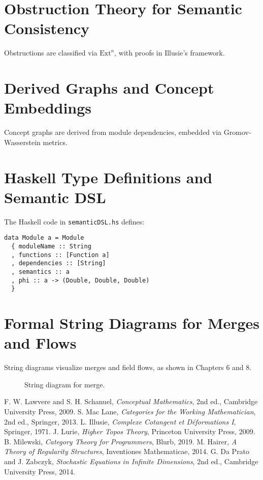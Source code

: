 \documentclass[12pt]{article}
\begin{document}
\section{Obstruction Theory for Semantic Consistency}
Obstructions are classified via $\text{Ext}^n$, with proofs in Illusie’s framework.

\section{Derived Graphs and Concept Embeddings}
Concept graphs are derived from module dependencies, embedded via Gromov-Wasserstein metrics.

\section{Haskell Type Definitions and Semantic DSL}
The Haskell code in \texttt{semanticDSL.hs} defines:
\begin{lstlisting}
data Module a = Module
  { moduleName :: String
  , functions :: [Function a]
  , dependencies :: [String]
  , semantics :: a
  , phi :: a -> (Double, Double, Double)
  }
\end{lstlisting}

\section{Formal String Diagrams for Merges and Flows}
String diagrams visualize merges and field flows, as shown in Chapters 6 and 8.

\begin{figure}[h]
    \centering
    \caption{String diagram for merge.}
\end{figure}

\begin{thebibliography}{9}
F. W. Lawvere and S. H. Schanuel, \emph{Conceptual Mathematics}, 2nd ed., Cambridge University Press, 2009.
S. Mac Lane, \emph{Categories for the Working Mathematician}, 2nd ed., Springer, 2013.
L. Illusie, \emph{Complexe Cotangent et D{\'e}formations I}, Springer, 1971.
J. Lurie, \emph{Higher Topos Theory}, Princeton University Press, 2009.
B. Milewski, \emph{Category Theory for Programmers}, Blurb, 2019.
M. Hairer, \emph{A Theory of Regularity Structures}, Inventiones Mathematicae, 2014.
G. Da Prato and J. Zabczyk, \emph{Stochastic Equations in Infinite Dimensions}, 2nd ed., Cambridge University Press, 2014.
\end{thebibliography}
\end{document}
